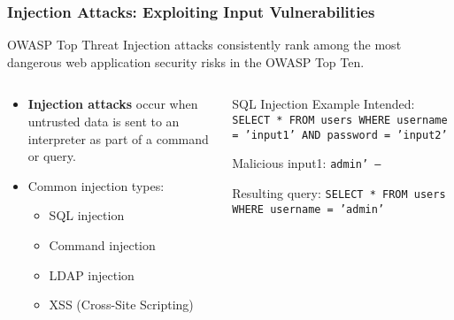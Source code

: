 \documentclass{beamer}
\begin{document}
\begin{frame}
    \frametitle{Injection Attacks: Exploiting Input Vulnerabilities}
    
    \begin{alertblock}{OWASP Top Threat}
        Injection attacks consistently rank among the most dangerous web application security risks in the OWASP Top Ten.
    \end{alertblock}
    
    \begin{columns}
        \begin{column}{0.5\textwidth}
            \begin{itemize}
                \item \textbf{Injection attacks} occur when untrusted data is sent to an interpreter as part of a command or query.
                \item Common injection types:
                    \begin{itemize}
                        \item SQL injection
                        \item Command injection
                        \item LDAP injection
                        \item XSS (Cross-Site Scripting)
                    \end{itemize}
            \end{itemize}
        \end{column}
        \begin{column}{0.6\textwidth}
            \begin{block}{SQL Injection Example}
                Intended: \texttt{SELECT * FROM users WHERE username = 'input1' AND password = 'input2'} \newline
                
                Malicious input1:
                \texttt{admin' --} \newline
                
                Resulting query:
                \texttt{SELECT * FROM users WHERE username = 'admin'} \newline
            \end{block}
        \end{column}
    \end{columns}
\end{frame}
\end{document}
